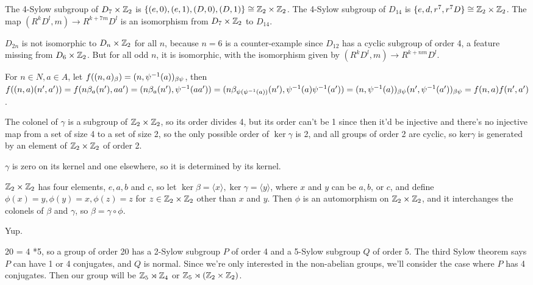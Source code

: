 \documentclass[11pt, oneside]{article}   	%
\begin{document}
\item The 4-Sylow subgroup of $D_7 \times \mathbb{Z}_2$ is $\{(e, 0), (e, 1), (D, 0), (D, 1)\} \cong \mathbb{Z}_2 \times \mathbb{Z}_2$. The 4-Sylow subgroup of $D_{14}$ is $\{e, d, r^7, r^7D\} \cong \mathbb{Z}_2 \times \mathbb{Z}_2$. The map $(R^kD^l, m) \to R^{k+7m}D^l$ is an isomorphism from $D_7 \times \mathbb{Z}_2$ to $D_{14}$.
\item $D_{2n}$ is not isomorphic to $D_n \times \mathbb{Z}_2$ for all $n$, because $n = 6$ is a counter-example since $D_{12}$ has a cyclic subgroup of order 4, a feature missing from $D_6 \times \mathbb{Z}_2$. But for all odd $n$, it is isomorphic, with the isomorphism given by $(R^kD^l, m) \to R^{k+nm}D^l$.
\item For $n \in N, a \in A$, let $f((n, a)_\beta) = (n, \psi^{-1}(a))_{\beta\psi}$, then $f((n, a)(n', a')) = f(n\beta_a(n'), aa') = (n\beta_a(n'), \psi^{-1}(aa')) = (n\beta_{\psi(\psi^{-1}(a))}(n'), \psi^{-1}(a)\psi^{-1}(a')) = (n, \psi^{-1}(a))_{\beta\psi}(n', \psi^{-1}(a'))_{\beta\psi} = f(n, a)f(n', a')$.
\item \be
\item The colonel of $\gamma$ is a subgroup of $\mathbb{Z}_2 \times \mathbb{Z}_2$, so its order divides 4, but its order can't be 1 since then it'd be injective and there's no injective map from a set of size 4 to a set of size 2, so the only possible order of $\ker\gamma$ is 2, and all groups of order 2 are cyclic, so ker$\gamma$ is generated by an element of $\mathbb{Z}_2\times \mathbb{Z}_2$ of order 2.
\item $\gamma$ is zero on its kernel and one elsewhere, so it is determined by its kernel.
\item $\mathbb{Z}_2 \times \mathbb{Z}_2$ has four elements, $e, a, b$ and $c$, so let $\ker\beta = \langle x \rangle, \ker\gamma = \langle y \rangle$, where $x$ and $y$ can be $a, b$, or $c$, and define $\phi(x) = y, \phi(y) = x, \phi(z) = z$ for $z \in \mathbb{Z}_2 \times \mathbb{Z}_2$ other than $x$ and $y$. Then $\phi$ is an automorphism on $\mathbb{Z}_2 \times \mathbb{Z}_2$, and it interchanges the colonels of $\beta$ and $\gamma$, so $\beta = \gamma \circ \phi$.
\item Yup.
\ee
\item 20 = 4 *5, so a group of order 20 has a 2-Sylow subgroup $P$ of order 4 and a 5-Sylow subgroup $Q$ of order 5. The third Sylow theorem says $P$ can have 1 or 4 conjugates, and $Q$ is normal. Since we're only interested in the non-abelian groups, we'll consider the case where $P$ has 4 conjugates. Then our group will be $\mathbb{Z}_5 \rtimes \mathbb{Z}_4$ or $\mathbb{Z}_5 \rtimes (\mathbb{Z}_2 \times \mathbb{Z}_2)$. 
\end{document}
